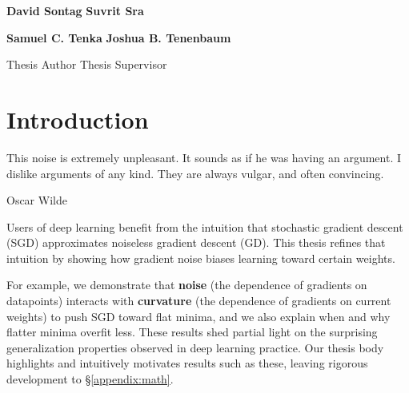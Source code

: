 \documentclass[openany, notitlepage, justified]{tufte-book}
\theoremstyle{plain}
\theoremstyle{definition}
\begin{document}
    \par\noindent \hrulefill            \sss \hrulefill
    \par\noindent \textbf{David Sontag} \sss \textbf{Suvrit Sra} 
    \par\noindent \apeecs               \sss \apeecs            
    \par\noindent \rqecp                \sss \rqecp              

    \vspace{1.5cm}

    \par\noindent \hrulefill                \sss    \hrulefill
    \par\noindent \textbf{Samuel C. Tenka}  \sss    \textbf{Joshua B. Tenenbaum}
    \par\noindent \bs                   \sss \pbcs
    \par\noindent Thesis Author         \sss Thesis Supervisor

\restoregeometry
    

\chapter{Introduction}

    \renewcommand{\textflush}{flushright}
    \setlength{\epigraphwidth}{0.83\columnwidth}
    \epigraph{
        This noise is extremely unpleasant. It sounds as if he was having an
        argument. I dislike arguments of any kind. They are always vulgar, and
        often convincing.
    }{Oscar Wilde}




    Users of deep learning benefit from the intuition that stochastic gradient
    descent (SGD) approximates noiseless gradient descent (GD).\cite{bo91}
    This thesis refines that intuition by showing how gradient noise biases
    learning toward certain weights.%

    For example, we demonstrate that \textbf{noise} (the dependence of
    gradients on datapoints) interacts with \textbf{curvature} (the dependence
    of gradients on current weights) to push SGD toward flat minima, and we
    also explain when and why flatter minima overfit less.  These results shed
    partial light on the surprising generalization properties observed in deep
    learning practice.  
    Our thesis body highlights and intuitively motivates results such as these,
    leaving rigorous development to \S\ref{appendix:math}.
\end{document}
